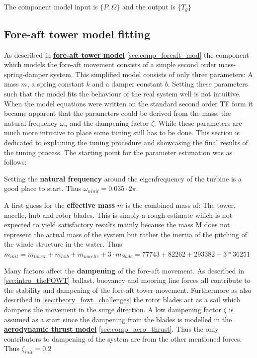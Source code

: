 The component model input is $ \{P, \Omega\} $ and the output is $ \{T_g\} $



\subsection{Fore-aft tower model fitting} \label{sec:app_mod_foreaft_fitting}
As described in \hyperref[sec:comp_foreaft_mod]{\textbf{fore-aft tower model}} \cref{sec:comp_foreaft_mod} the component which models the fore-aft movement consists of a simple second order mass-spring-damper system. This simplified model consists of only three parameters: A mass $ m $, a spring constant $ k $ and a damper constant $ b $. Setting these parameters such that the model fits the behaviour of the real system well is not intuitive. When the model equations were written on the standard second order TF form it became apparent that the parameters could be derived from the mass, the natural frequency $ \omega_n $ and the dampening factor $ \zeta $. While these parameters are much more intuitive to place some tuning still has to be done. This section is dedicated to explaining the tuning procedure and showcasing the final results of the tuning process. The starting point for the parameter estimation was as follows:

\smallskip
\noindent Setting the \textbf{natural frequency} around the eigenfrequency of the turbine is a good place to start. Thus $ \omega_{ninit} = 0.035 \cdot 2 \pi $.

\smallskip
\noindent A first guess for the \textbf{effective mass} $ m $ is the combined mass of: The tower, nacelle, hub and rotor blades. This is simply a rough estimate which is not expected to yield satisfactory results mainly because the mass M does not represent the actual mass of the system but rather the inertia of the pitching of the whole structure in the water. Thus $ m_{init} = m_{tower} + m_{hub} + m_{nacelle} + 3 \cdot m_{blade} = 77743 + 82262 + 293382 + 3*36251 $

\smallskip
\noindent Many factors affect the \textbf{dampening} of the fore-aft movement. As described in \cref{sec:intro_theFOWT} ballast, buoyancy and mooring line forces all contribute to the stability and dampening of the fore-aft tower movement. Furthermore as also described in \cref{sec:theory_fowt_challenges} the rotor blades act as a sail which dampens the movement in the surge direction. A low dampening factor $ \zeta $ is assumed as a start since the dampening from the blades is modelled in the \hyperref[sec:comp_aero_thrust]{\textbf{aerodynamic thrust model}} \cref{sec:comp_aero_thrust}. Thus the only contributors to dampening of the system are from the other mentioned forces. Thus $ \zeta_{init} = 0.2 $

